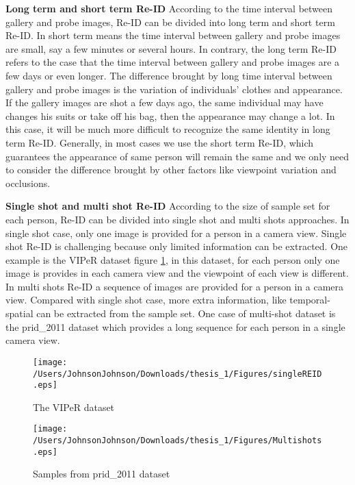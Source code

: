 \textbf{Long term and short term Re-ID} According to the time interval between gallery and probe images, Re-ID can be divided into long term and short term Re-ID.  In short term means the time interval between gallery and probe images are small, say a few minutes or several hours. In contrary, the long term Re-ID refers to the case that the time interval between gallery and probe images are a few days or even longer. The difference brought by long time interval between gallery and probe images is the variation of individuals' clothes and appearance. If the gallery images are shot a few days ago, the same individual may have changes his suits or take off his bag, then the appearance may change a lot. In this case, it will be much more difficult to recognize the same identity in long term Re-ID. Generally, in most cases we use the short term Re-ID, which guarantees the appearance of same person will remain the same and we only need to consider the difference brought by other factors like viewpoint variation and occlusions.


\textbf{Single shot and multi shot Re-ID} According to the size of sample set for each person, Re-ID can be divided into single shot and multi shots approaches. In single shot case, only one image is provided for a person in a camera view. Single shot Re-ID is challenging because only limited information can be extracted. One example is the VIPeR dataset figure \ref{VIPeRimages}, in this dataset, for each person only one image is provides in each camera view and the viewpoint of each view is different. In multi shots Re-ID a sequence of images are provided for a person in a camera view. Compared with single shot case, more extra information, like temporal-spatial can be extracted from the sample set. One case of multi-shot dataset is the prid\_2011 dataset which provides a long sequence for each person in a single camera view.

\begin{figure}[H]

\texttt{[image: /Users/JohnsonJohnson/Downloads/thesis\_1/Figures/singleREID.eps]}
\vspace{-3em}
\caption{The VIPeR dataset}
\label{VIPeRimages}
\end{figure}


\begin{figure}[H]

\texttt{[image: /Users/JohnsonJohnson/Downloads/thesis\_1/Figures/Multishots.eps]}
\vspace{-3em}
\caption{Samples from prid\_2011 dataset}

\end{figure}


